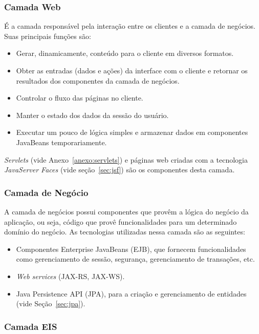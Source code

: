 \documentclass[
  10.5pt,				  %
	openright,			%
	twoside,			  %
  a5paper,
  chapter=TITLE,	%
	section=TITLE,	%
  hyphens,        %
	english,        %
	brazil          %
]{abntex2}
\begin{document}
\subsubsection{Camada Web}\label{sec:camada-web}

É a camada responsável pela interação entre os clientes e a camada de negócios. Suas principais funções são:
\begin{itemize}
  \item Gerar, dinamicamente, conteúdo para o cliente em diversos formatos.
  \item Obter as entradas (dados e ações) da interface com o cliente e retornar os resultados dos componentes da camada de negócios.
  \item Controlar o fluxo das páginas no cliente.
  \item Manter o estado dos dados da sessão do usuário.
  \item Executar um pouco de lógica simples e armazenar dados em componentes JavaBeans temporariamente.
\end{itemize}

\emph{Servlets} (vide Anexo~\ref{anexo:servlets}) e páginas web criadas com a tecnologia \emph{JavaServer Faces} (vide seção~\ref{sec:jsf}) são os componentes desta camada. 


\subsubsection{Camada de Negócio}\label{sec:camada-negocio}
A camada de negócios possui componentes que provêm a lógica do negócio da aplicação, ou seja, código que provê funcionalidades para um determinado domínio do negócio. As tecnologias utilizadas nessa camada são as seguintes:
\begin{itemize}
  \item Componentes Enterprise JavaBeans (EJB), que fornecem funcionalidades como gerenciamento de sessão, segurança, gerenciamento de transações, etc.
  \item \emph{Web services} (JAX-RS, JAX-WS).
  \item Java Persistence API (JPA), para a criação e gerenciamento de entidades (vide Seção~\ref{sec:jpa}).
\end{itemize}


\subsubsection{Camada EIS}
\end{document}
